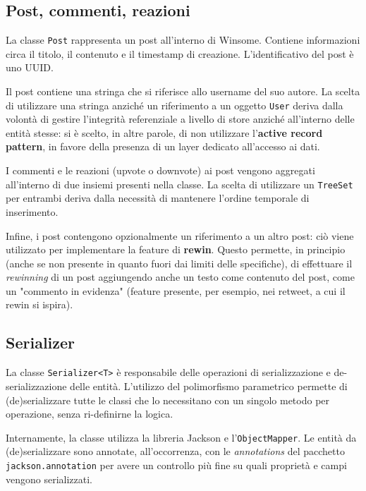 \documentclass[a4paper,8pt]{article} %
\def\code#1{\texttt{#1}}
\begin{document}
\subsection{Post, commenti, reazioni}
La classe \code{Post} rappresenta un post all'interno di Winsome. Contiene informazioni circa il titolo, il contenuto e il timestamp di creazione. L'identificativo del post è uno UUID.
\par Il post contiene una stringa che si riferisce allo username del suo autore. La scelta di utilizzare una stringa anziché un riferimento a un oggetto \code{User} deriva dalla volontà
di gestire l'integrità referenziale a livello di store anziché all'interno delle entità stesse: si è scelto, in altre parole, di non utilizzare l'\textbf{active record pattern}, in favore
della presenza di un layer dedicato all'accesso ai dati.
\par I commenti e le reazioni (upvote o downvote) ai post vengono aggregati all'interno di due insiemi presenti nella classe. La scelta di utilizzare un \code{TreeSet} per entrambi deriva
dalla necessità di mantenere l'ordine temporale di inserimento.
\par Infine, i post contengono opzionalmente un riferimento a un altro post: ciò viene utilizzato per implementare la feature di \textbf{rewin}. Questo permette, in principio (anche se non
presente in quanto fuori dai limiti delle specifiche), di effettuare il \emph{rewinning} di un post aggiungendo anche un testo come contenuto del post, come un "commento in evidenza" (feature presente,
per esempio, nei retweet, a cui il rewin si ispira).
\subsection{Serializer}
La classe \code{Serializer<T>} è responsabile delle operazioni di serializzazione e de-serializzazione delle entità.
L'utilizzo del polimorfismo parametrico permette di (de)serializzare tutte le classi che lo necessitano con un singolo metodo per operazione, senza ri-definirne
la logica.
\par Internamente, la classe utilizza la libreria Jackson e l'\code{ObjectMapper}. Le entità da (de)serializzare sono annotate, all'occorrenza, con le \emph{annotations} del pacchetto
\code{jackson.annotation} per avere un controllo più fine su quali proprietà e campi vengono serializzati.
\end{document}
